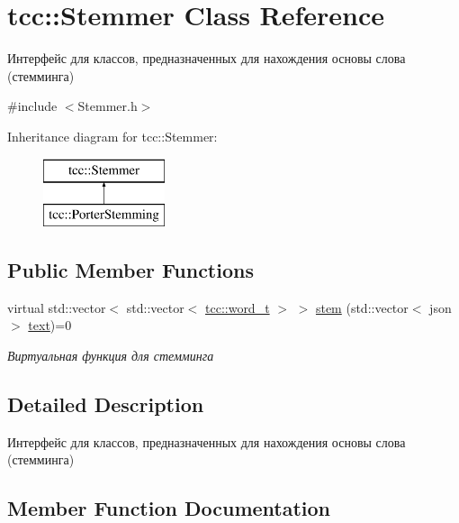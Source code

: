 \hypertarget{classtcc_1_1_stemmer}{}\section{tcc\+:\+:Stemmer Class Reference}
\label{classtcc_1_1_stemmer}


Интерфейс для классов, предназначенных для нахождения основы слова (стемминга)  




{\ttfamily \#include $<$Stemmer.\+h$>$}

Inheritance diagram for tcc\+:\+:Stemmer\+:\begin{figure}[H]
\begin{center}
\leavevmode
\includegraphics[height=2.000000cm]{classtcc_1_1_stemmer}
\end{center}
\end{figure}
\subsection*{Public Member Functions}
\begin{DoxyCompactItemize}
\item 
virtual std\+::vector$<$ std\+::vector$<$ \hyperlink{namespacetcc_a310a95f44f9f0b3198b9758732eba6b9}{tcc\+::word\+\_\+t} $>$ $>$ \hyperlink{classtcc_1_1_stemmer_a0131d8cb63b514e594d2407048687cff}{stem} (std\+::vector$<$ json $>$ \hyperlink{group__aliases_ga085c5ca5bf5645ff17c0ede30f56b08f}{text})=0
\begin{DoxyCompactList}\small\item\em Виртуальная функция для стемминга \end{DoxyCompactList}\end{DoxyCompactItemize}


\subsection{Detailed Description}
Интерфейс для классов, предназначенных для нахождения основы слова (стемминга) 

\subsection{Member Function Documentation}
